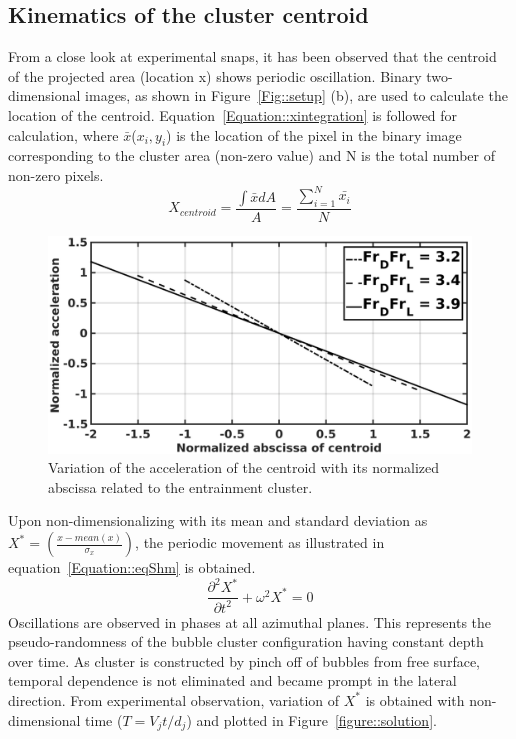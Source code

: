\subsection{Kinematics of the cluster centroid}
From a close look at experimental snaps, it has been observed that the centroid of the projected area (location x) shows periodic oscillation. Binary two-dimensional images, as shown in Figure~\ref{Fig::setup} (b), are used to calculate the location of the centroid. Equation~\ref{Equation::xintegration} is followed for calculation, where $\bar{x}$($x_i , y_i$) is the location of the pixel in the binary image corresponding to the cluster area (non-zero value) and N is the total number of non-zero pixels.
\begin{equation}
X_{centroid} = \frac{\int \bar{x}dA}{A} = \frac{\sum_{i = 1}^{N}\bar{x_i}}{N}
\label{Equation::xintegration}
\end{equation}
\begin{figure}
	\centering
	\includegraphics[width=\linewidth]{chapters/jetPool/Figure18}
	\caption{Variation of the acceleration of the centroid with its normalized abscissa related to the entrainment cluster.}
	\label{figure::acc}
\end{figure}
Upon non-dimensionalizing with its mean and standard deviation as $ X^{*} = \left(\frac{x-mean(x)}{\sigma_{x}}\right)$, the periodic movement as illustrated in equation~\ref{Equation::eqShm} is obtained.
\begin{equation}
\frac{\partial^2 X^*}{\partial t^2} + \omega^2X^{*} = 0
\label{Equation::eqShm}
\end{equation} 
Oscillations are observed in phases at all azimuthal planes. This represents the pseudo-randomness of the bubble cluster configuration having constant depth over time. As cluster is constructed by pinch off of bubbles from free surface, temporal dependence is not eliminated and became prompt in the lateral direction. From experimental observation, variation of $X^*$ is obtained with non-dimensional time ($T = V_jt/d_j$) and plotted in Figure~\ref{figure::solution}.
